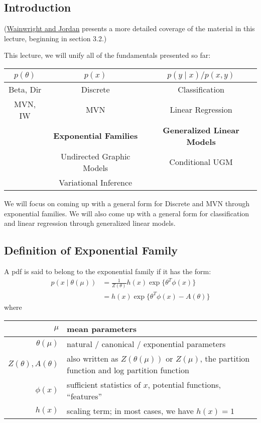 \documentclass{article}
\begin{document}

\subsection{Introduction}
(\href{https://people.eecs.berkeley.edu/~wainwrig/Papers/WaiJor08_FTML.pdf}{Wainwright and Jordan} presents a more detailed coverage of the material in this lecture, beginning in section 3.2.)

\medskip

\noindent This lecture, we will unify all of the fundamentals presented so far:
\begin{center}
\begin{tabular}{c | c | c }
    $p(\theta)$ & $p(x)$ & $p(y \mid x) / p(x, y)$  \\ \hline
    Beta, Dir & Discrete & Classification \\ \hline
    MVN, IW & MVN & Linear Regression \\ \hline
    & \textbf{Exponential Families} & \textbf{Generalized Linear Models} \\ \hline
     &Undirected Graphic Models & Conditional UGM \\ \hline
    & Variational Inference %
\end{tabular}
\end{center}
We will focus on coming up with a general form for Discrete and MVN through exponential families. We will also come up with a general form for classification and linear regression through generalized linear models. 

\subsection{Definition of Exponential Family}
A pdf is said to belong to the exponential family if it has the form:
\begin{align*}
p(x \mid \theta(\mu)) &= \frac{1}{Z(\theta)} h(x) \exp\{\theta^T \phi(x)\} \\
&= h(x) \exp\{\theta^T \phi(x) - A(\theta)\}
\end{align*}
where
\medskip

\begin{center}
\begin{tabular}{r | l}
    $\mu$ & mean parameters \\ \hline
    $\theta(\mu)$ & natural / canonical / exponential parameters \\ \hline
    $Z(\theta), A(\theta)$ & also written as $Z(\theta(\mu))$ or $Z(\mu)$, the partition function and log partition function \\ \hline
    $\phi(x)$ & sufficient statistics of $x$, potential functions, ``features'' \\ \hline
    $h(x)$ & scaling term; in most cases, we have $h(x) = 1$
\end{tabular}
\end{center}
\end{document}
